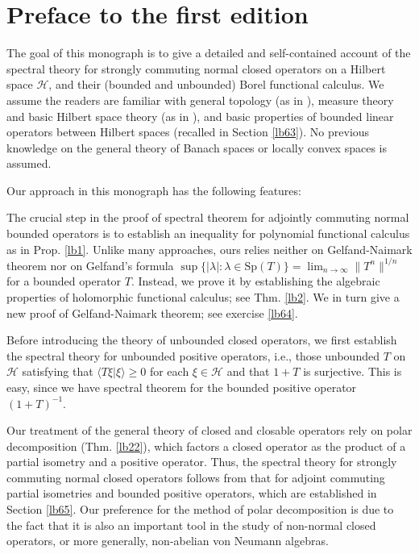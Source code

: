 \documentclass[12pt,b5paper,notitlepage]{article}
\theoremstyle{definition}
\theoremstyle{plain}
\newcommand{\mc}{\mathcal}
\newcommand{\bk}[1]{\langle {#1}\rangle}
\newcommand{\Sp}{\mathrm{Sp}}
\numberwithin{equation}{section}
\begin{document}
\section*{Preface to the first edition}


The goal of this monograph is to give a detailed and self-contained account of the spectral theory for strongly commuting normal closed operators on a Hilbert space $\mc H$, and their (bounded and unbounded) Borel functional calculus. We assume the readers are familiar with general topology (as in \cite{Mun}), measure theory and basic Hilbert space theory (as in \cite{Rud-R}), and basic properties of bounded linear operators between Hilbert spaces (recalled in Section \ref{lb63}). No previous knowledge on the general theory of Banach spaces or locally convex spaces is assumed.

Our approach in this monograph has the following features:

The crucial step in the proof of spectral theorem for adjointly commuting normal bounded operators is to establish an inequality for polynomial functional calculus as in Prop. \ref{lb1}. Unlike many approaches, ours relies neither on Gelfand-Naimark theorem nor on Gelfand's formula $\sup\{|\lambda|:\lambda\in\Sp(T)\}=\lim_{n\rightarrow\infty}\lVert T^n\lVert^{1/n}$ for a bounded operator $T$. Instead, we prove it by establishing the algebraic properties of holomorphic functional calculus; see Thm. \ref{lb2}. We in turn give a new proof of Gelfand-Naimark theorem; see exercise \ref{lb64}.

Before introducing the theory of unbounded closed operators, we first establish the spectral theory for unbounded positive operators, i.e., those unbounded $T$ on $\mc H$ satisfying that $\bk{T\xi|\xi}\geq 0$ for each $\xi\in\mc H$ and that $1+T$ is surjective. This is easy, since we have spectral theorem for the bounded positive operator $(1+T)^{-1}$.

Our treatment of the general theory of closed and closable operators rely on polar decomposition (Thm. \ref{lb22}), which factors a closed operator as the product of a partial isometry and a positive operator. Thus, the spectral theory for strongly commuting normal closed operators follows from that for adjoint commuting partial isometries and bounded positive operators, which are established in Section \ref{lb65}. Our preference for the method of polar decomposition is due to the fact that it is also an important tool in the study of non-normal closed operators, or more generally, non-abelian von Neumann algebras.
\end{document}
